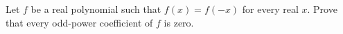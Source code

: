 Let $f$ be a real polynomial such that $f(x)=f(-x)$ for every real $x$. Prove that every odd-power coefficient of $f$ is zero.

